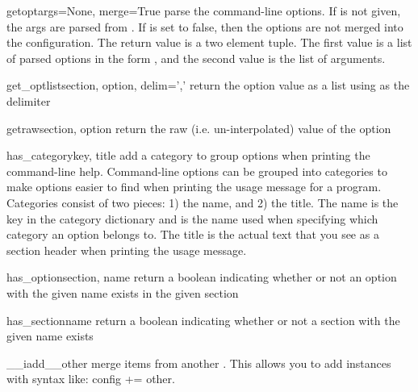 \begin{methoddesc}[ConfigManager]{getopt}{args=None, merge=True}
parse the command-line options.  If  is not given, the 
args are parsed from .  If  is set to false,
then the options are not merged into the configuration.  The return value
is a two element tuple.  The first value is a list of parsed options
in the form , and the second value is the list of
arguments.
\end{methoddesc}

\begin{methoddesc}[ConfigManager]{get_optlist}{section, option, delim=','}
return the option value as a list using  as the delimiter
\end{methoddesc}

\begin{methoddesc}[ConfigManager]{getraw}{section, option}
return the raw (i.e. un-interpolated) value of the option
\end{methoddesc}

\begin{methoddesc}[ConfigManager]{has_category}{key, title}
add a category to group options when printing the command-line help.
Command-line options can be grouped into categories to make options easier
to find when printing the usage message for a program.  Categories consist
of two pieces: 1) the name, and 2) the title.  The name is the key in
the category dictionary and is the name used when specifying which category
an option belongs to.  The title is the actual text that you see as a 
section header when printing the usage message.
\end{methoddesc}

\begin{methoddesc}[ConfigManager]{has_option}{section, name}
return a boolean indicating whether or not an option with the given name exists
in the given section
\end{methoddesc}

\begin{methoddesc}[ConfigManager]{has_section}{name}
return a boolean indicating whether or not a section with the given name exists
\end{methoddesc}

\begin{methoddesc}[ConfigManager]{__iadd__}{other}
merge items from another .  This allows you to add
 instances with syntax like: config += other.
\end{methoddesc}

